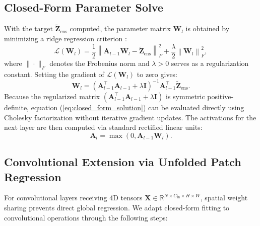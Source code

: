 \documentclass[journal]{IEEEtran}
\begin{document}
\subsection{Closed-Form Parameter Solve}
With the target $\tilde{\mathbf{Z}}_{\text{ens}}$ computed, the parameter matrix $\mathbf{W}_l$ is obtained by minimizing a ridge regression criterion \cite{hoerl1970ridge}:
\begin{equation}
\label{eq:ridge_objective}
\mathcal{L}(\mathbf{W}_l) = \frac{1}{2} \left\| \mathbf{A}_{l-1} \mathbf{W}_l - \tilde{\mathbf{Z}}_{\text{ens}} \right\|_F^2 + \frac{\lambda}{2} \left\| \mathbf{W}_l \right\|_F^2,
\end{equation}
where $\|\cdot\|_F$ denotes the Frobenius norm and $\lambda > 0$ serves as a regularization constant. Setting the gradient of $\mathcal{L}(\mathbf{W}_l)$ to zero gives:
\begin{equation}
\label{eq:closed_form_solution}
\mathbf{W}_l = \left( \mathbf{A}_{l-1}^\top \mathbf{A}_{l-1} + \lambda \mathbf{I} \right)^{-1} \mathbf{A}_{l-1}^\top \tilde{\mathbf{Z}}_{\text{ens}}.
\end{equation}
Because the regularized matrix $(\mathbf{A}_{l-1}^\top \mathbf{A}_{l-1} + \lambda \mathbf{I})$ is symmetric positive-definite, equation (\ref{eq:closed_form_solution}) can be evaluated directly using Cholesky factorization without iterative gradient updates. The activations for the next layer are then computed via standard rectified linear units:
\begin{equation}
\mathbf{A}_l = \max\left(0, \mathbf{A}_{l-1} \mathbf{W}_l\right).
\end{equation}

\subsection{Convolutional Extension via Unfolded Patch Regression}
For convolutional layers receiving 4D tensors $\mathbf{X} \in \mathbb{R}^{N \times C_{\text{in}} \times H \times W}$, spatial weight sharing prevents direct global regression. We adapt closed-form fitting to convolutional operations through the following steps:
\end{document}
